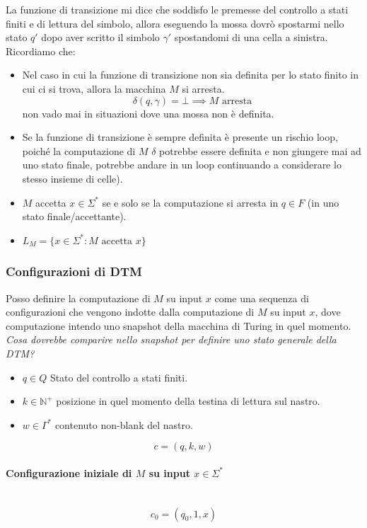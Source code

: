 \documentclass{article}
\begin{document}
La funzione di transizione mi dice che soddisfo le premesse del controllo a stati finiti
e di lettura del simbolo, allora eseguendo la mossa dovrò spostarmi nello stato $q'$
dopo aver scritto il simbolo $\gamma'$ spostandomi di una cella a sinistra.
Ricordiamo che:
\begin{itemize}
    \item Nel caso in cui la funzione di transizione non sia definita per lo stato
    finito in cui ci si trova, allora la macchina $M$ si arresta.
    $$\delta(q,\gamma)=\bot\implies M\text{ arresta}$$
    non vado mai in situazioni dove una mossa non è definita.
    \item Se la funzione di transizione è sempre definita è presente un
    rischio loop, poiché la computazione
    di $M$ $\delta$ potrebbe essere definita e non giungere mai ad uno stato finale, potrebbe
    andare in un loop continuando a considerare lo stesso insieme di celle).
    \item $M$ accetta $x\in\Sigma^*$ se e solo se la computazione si arresta
    in $q\in F$ (in uno stato finale/accettante).
    \item $L_M=\{x\in\Sigma^*:M\text{ accetta }x\}$
\end{itemize}

\subsubsection{Configurazioni di DTM}
Posso definire la computazione di $M$ su input $x$ come una sequenza di configurazioni
che vengono indotte dalla computazione di $M$ su input $x$, dove computazione intendo
uno snapshot della macchina di Turing in quel momento. \textit{Cosa dovrebbe comparire
nello snapshot per definire uno stato generale della DTM?}
\begin{itemize}
    \item $q\in Q$ Stato del controllo a stati finiti.
    \item $k\in\mathbb{N}^+$ posizione in quel momento della testina di lettura sul nastro.
    \item $w\in\Gamma^*$ contenuto non-blank del nastro.
\end{itemize}
$$c=(q,k,w)$$
\paragraph{Configurazione iniziale di $M$ su input $x\in\Sigma^*$}\mbox{}\\
$$c_0=(q_0,1,x)$$
\end{document}
